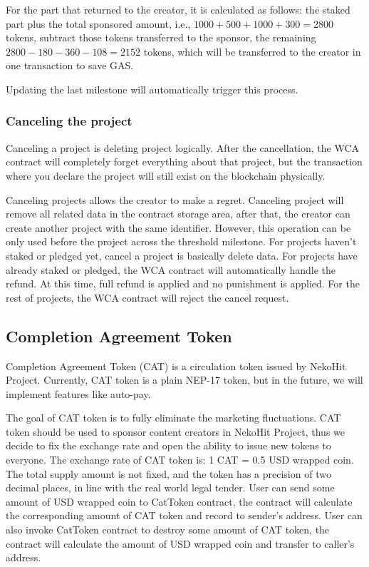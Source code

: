 For the part that returned to the creator, it is calculated as follows: the
staked part plus the total sponsored amount, i.e.,
$1000 + 500 + 1000 + 300 = 2800$ tokens, subtract those tokens transferred
to the sponsor, the remaining $2800 - 180 - 360 - 108 = 2152$ tokens, which
will be transferred to the creator in one transaction to save GAS\@.

Updating the last milestone will automatically trigger this process.

\subsubsection{Canceling the project}

Canceling a project is deleting project logically. After the cancellation,
the WCA contract will completely forget everything about that project, but
the transaction where you declare the project will still exist on the blockchain
physically.

Canceling projects allows the creator to make a regret. Canceling project will
remove all related data in the contract storage area, after that, the creator
can create another project with the same identifier. However, this operation
can be only used before the project across the threshold milestone.
For projects haven't staked or pledged yet, cancel a project is basically delete
data. For projects have already staked or pledged, the WCA contract will automatically
handle the refund. At this time, full refund is applied and no punishment is applied.
For the rest of projects, the WCA contract will reject the cancel request.

\subsection{Completion Agreement Token}\label{subsec:cat}

Completion Agreement Token (CAT) is a circulation token issued by NekoHit Project.
Currently, CAT token is a plain NEP-17 token, but in the future, we will implement
features like auto-pay.

The goal of CAT token is to fully eliminate the marketing fluctuations.
CAT token should be used to sponsor content creators in NekoHit Project, thus
we decide to fix the exchange rate and open the ability to issue new tokens to
everyone.
The exchange rate of CAT token is: 1 CAT = 0.5 USD wrapped coin.
The total supply amount is not fixed, and the token has a precision of two
decimal places, in line with the real world legal tender.
User can send some amount of USD wrapped coin to CatToken contract, the contract
will calculate the corresponding amount of CAT token and record to sender's address.
User can also invoke CatToken contract to destroy some amount of CAT token, the
contract will calculate the amount of USD wrapped coin and transfer to caller's
address.

